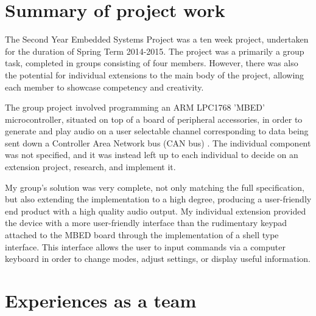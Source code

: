 \section{Summary of project work}

The Second Year Embedded Systems Project was a ten week project, undertaken 
for the duration of Spring Term 2014-2015. 
The project was a primarily a group task, completed in groups consisting of four 
members. 
However, there was also the potential for individual extensions to the main 
body of the project, allowing each member to showcase competency and creativity.
\par\bigskip\noindent
The group project involved programming an ARM LPC1768 'MBED' microcontroller, 
situated on top of a board of peripheral accessories, in order to 
generate and play audio on a user selectable channel corresponding to data 
being sent down a Controller Area Network bus (CAN bus) \cite{can-wiki}.
The individual component was not specified, and it was instead left up to each 
individual to decide on an extension project, research, and implement it. 
\par\bigskip\noindent
My group's solution was very complete, not only matching the full specification, 
but also extending the implementation to a high degree, producing a user-friendly 
end product with a high quality audio output. 
My individual extension provided the device with a more user-friendly 
interface than the rudimentary keypad attached to the MBED board through the 
implementation of a shell type interface. 
This interface allows the user to input commands via a computer keyboard in 
order to change modes, adjust settings, or display useful information.

 
\section{Experiences as a team}

